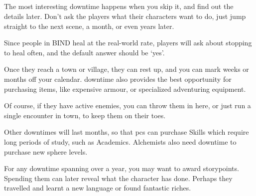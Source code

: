 \begin{multicols}{2}
\subsection{}

The most interesting \gls{downtime} happens when you skip it, and find out the details later.
Don't ask the players what their characters want to do, just jump straight to the next scene, a month, or even years later.


Since people in BIND heal at the real-world rate, players will ask about stopping to heal often, and the default answer should be `yes'.

Once they reach a town or village, they can rest up, and you can mark weeks or months off your calendar.
\Gls{downtime} also provides the best opportunity for purchasing items, like expensive armour, or specialized adventuring equipment.

Of course, if they have active enemies, you can throw them in here, or just run a single encounter in town, to keep them on their toes.

Other \glspl{downtime} will last months, so that \glspl{pc} can purchase Skills which require long periods of study, such as Academics.
Alchemists also need \gls{downtime} to purchase new sphere levels.

For any \gls{downtime} spanning over a year, you may want to award \glspl{storypoint}.
Spending them can later reveal what the character has done.
Perhaps they travelled and learnt a new language or found fantastic riches.

\end{multicols}
